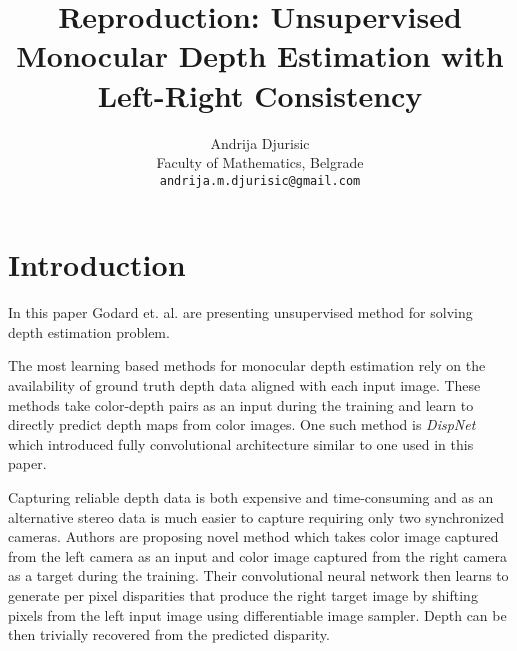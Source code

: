 \documentclass{article}
\title{Reproduction: Unsupervised Monocular Depth Estimation with Left-Right Consistency}
\author{
	Andrija Djurisic\\
	Faculty of Mathematics, Belgrade\\
	\texttt{andrija.m.djurisic@gmail.com} \\
}
\begin{document}
	
	\maketitle
	
	
\section{Introduction}
In this paper\cite{monodepth} Godard et. al. are presenting unsupervised method for solving depth estimation problem. 


The most learning based methods for monocular depth estimation rely on the availability of ground truth depth data aligned with each input image. These methods take color-depth pairs as an input during the training and learn to directly predict depth maps from color images. One such method is \emph{DispNet}\cite{dispnet} which introduced fully convolutional architecture similar to one used in this paper. 

Capturing reliable depth data is both expensive and time-consuming and as an alternative stereo data is much easier to capture requiring only two synchronized cameras. Authors are proposing novel method which takes color image captured from the left camera as an input and color image captured from the right camera as a target during the training. Their convolutional neural network then learns to generate per pixel disparities that produce the right target image by shifting pixels from the left input image using differentiable image sampler. Depth can be then trivially recovered from the predicted disparity.

\end{document}
